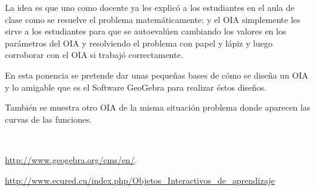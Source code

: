 \begin{titlepage}
\begin{minipage}{0.85\linewidth}
\begin{minipage}{0.85\linewidth}
\begin{resumen}
La idea es que uno como docente ya les explic\'o a los estudiantes en el aula de clase como se resuelve el problema matem\'aticamente; y el OIA simplemente les sirve a los estudiantes para que se autoeval\'uen cambiando los valores en los par\'ametros del OIA y resolviendo el problema con papel y l\'apiz y luego corroborar con el OIA si trabaj\'o correctamente.

En esta ponencia se pretende dar unas peque\~nas bases de c\'omo se dise\~na un OIA y lo amigable que es el Software GeoGebra para realizar \'estos dise\~nos.

Tambi\'en se muestra otro OIA de la misma situaci\'on problema donde aparecen las curvas de las funciones. 

    \end{resumen}
\end{minipage}
\vspace*{5pt}\\
\footnotesize
%  
    
\end{minipage}
\vspace{5pt}
\begin{thebibliography}{99}
 \url{http://www.geogebra.org/cms/en/}.

  \url{http://www.ecured.cu/index.php/Objetos_Interactivos_de_aprendizaje}

\end{thebibliography}
\end{titlepage}

